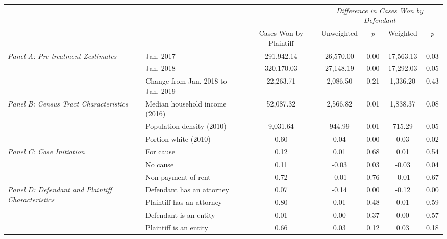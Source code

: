 \begin{tabular}{llccccc}
\toprule
 &  & \textit{} & \multicolumn{4}{c}{\textit{Difference in Cases Won by Defendant}} \\
 &  & Cases Won by Plaintiff & Unweighted & \emph{p} & Weighted & \emph{p} \\
\midrule
\multirow[c]{3}{3cm}{\textit{Panel A: Pre-treatment Zestimates}} & Jan. 2017 & 291,942.14 & 26,570.00 & 0.00 & 17,563.13 & 0.03 \\
 & Jan. 2018 & 320,170.03 & 27,148.19 & 0.00 & 17,292.03 & 0.05 \\
 & Change from Jan. 2018 to Jan. 2019 & 22,263.71 & 2,086.50 & 0.21 & 1,336.20 & 0.43 \\
\cline{1-7}
\multirow[c]{3}{3cm}{\textit{Panel B: Census Tract Characteristics}} & Median household income (2016) & 52,087.32 & 2,566.82 & 0.01 & 1,838.37 & 0.08 \\
 & Population density (2010) & 9,031.64 & 944.99 & 0.01 & 715.29 & 0.05 \\
 & Portion white (2010) & 0.60 & 0.04 & 0.00 & 0.03 & 0.02 \\
\cline{1-7}
\multirow[c]{3}{3cm}{\textit{Panel C: Case Initiation}} & For cause & 0.12 & 0.01 & 0.68 & 0.01 & 0.54 \\
 & No cause & 0.11 & -0.03 & 0.03 & -0.03 & 0.04 \\
 & Non-payment of rent & 0.72 & -0.01 & 0.76 & -0.01 & 0.67 \\
\cline{1-7}
\multirow[c]{4}{3cm}{\textit{Panel D: Defendant and Plaintiff Characteristics}} & Defendant has an attorney & 0.07 & -0.14 & 0.00 & -0.12 & 0.00 \\
 & Plaintiff has an attorney & 0.80 & 0.01 & 0.48 & 0.01 & 0.59 \\
 & Defendant is an entity & 0.01 & 0.00 & 0.37 & 0.00 & 0.57 \\
 & Plaintiff is an entity & 0.66 & 0.03 & 0.12 & 0.03 & 0.18 \\
\cline{1-7}
\bottomrule
\end{tabular}
